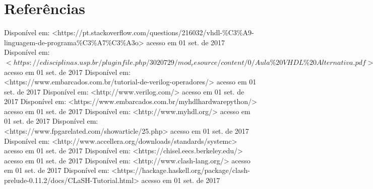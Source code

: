 \documentclass[12pt,a4paper]{article}
\begin{document}
\section*{Referências}
Disponível em: <https://pt.stackoverflow.com/questions/216032/vhdl-\%C3\%A9-linguagem-de-programa\%C3\%A7\%C3\%A3o> acesso em 01 set. de 2017  \newline \newline
Disponível em: $<https://edisciplinas.usp.br/pluginfile.php/3020729/mod_resource/content/0/Aula\%20VHDL\%20Alternativa.pdf>$ acesso em 01 set. de 2017 \newline  \newline
Disponível em: <https://www.embarcados.com.br/tutorial-de-verilog-operadores/> acesso em 01 set. de 2017 \newline \newline
Disponível em: <http://www.verilog.com/> acesso em 01 set. de 2017 \newline  \newline
Disponível em: <https://www.embarcados.com.br/myhdlhardwarepython/> acesso em 01 set. de 2017 \newline \newline
Disponível em: <http://www.myhdl.org/> acesso em 01 set. de 2017 \newline
Disponível em: <https://www.fpgarelated.com/showarticle/25.php> acesso em 01 set. de 2017 \newline \newline
Disponível em: <http://www.accellera.org/downloads/standards/systemc> acesso em 01 set. de 2017 \newline  \newline
Disponível em: <https://chisel.eecs.berkeley.edu/> acesso em 01 set. de 2017 \newline \newline
Disponível em: <http://www.clash-lang.org/> acesso em 01 set. de 2017 \newline \newline
Disponível em: <https://hackage.haskell.org/package/clash-prelude-0.11.2/docs/CLaSH-Tutorial.html> acesso em 01 set. de 2017 \newline
\end{document}
